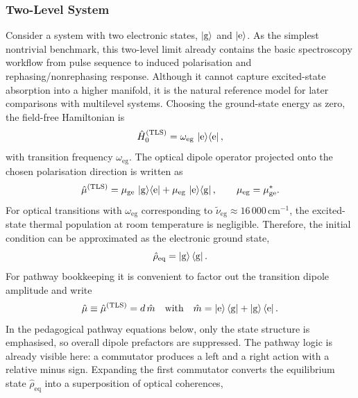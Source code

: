 \subsubsection{Two-Level System}
\label{sec:spctr_two_level_system_linear_response}
Consider a system with two electronic states, $\ket{\mathrm{g}}$ and $\ket{\mathrm{e}}$.
As the simplest nontrivial benchmark, this two-level limit already contains the basic spectroscopy workflow from pulse sequence to induced polarisation and rephasing/nonrephasing response.
Although it cannot capture excited-state absorption into a higher manifold, it is the natural reference model for later comparisons with multilevel systems.
Choosing the ground-state energy as zero, the field-free Hamiltonian is
\begin{equation}
	\hat{H}_{0}^{(\mathrm{TLS})} = \omega_{\mathrm{eg}}\,\ket{\mathrm{e}}\!\bra{\mathrm{e}},
	\label{eq:spctr_tls_hamiltonian}
\end{equation}
with transition frequency $\omega_{\mathrm{eg}}$.
The optical dipole operator projected onto the chosen polarisation direction is written as
\begin{equation}
	\hat{\mu}^{(\mathrm{TLS})}
	= \mu_{\mathrm{ge}}\,\ket{\mathrm{g}}\!\bra{\mathrm{e}} + \mu_{\mathrm{eg}}\,\ket{\mathrm{e}}\!\bra{\mathrm{g}},
	\qquad \mu_{\mathrm{eg}}=\mu_{\mathrm{ge}}^*.
	\label{eq:spctr_tls_dipole}
\end{equation}
For optical transitions with $\omega_{\mathrm{eg}}$ corresponding to $\tilde{\nu}_{\mathrm{eg}} \approx 16\,000\,\mathrm{cm}^{-1}$, the excited-state thermal population at room temperature is negligible.
Therefore, the initial condition can be approximated as the electronic ground state,
\begin{equation*}
	\hat{\rho}_{\mathrm{eq}} = \ket{\mathrm{g}}\bra{\mathrm{g}}.
\end{equation*}
For pathway bookkeeping it is convenient to factor out the transition dipole amplitude and write
\begin{equation*}
	\hat{\mu} \equiv \hat{\mu}^{(\mathrm{TLS})}=d\,\hat{m} \quad\text{with}\quad
	\hat{m} = \ket{\mathrm{e}}\bra{\mathrm{g}} + \ket{\mathrm{g}}\bra{\mathrm{e}}.
\end{equation*}
In the pedagogical pathway equations below, only the state structure is emphasised, so overall dipole prefactors are suppressed.
The pathway logic is already visible here: a commutator produces a left and a right action with a relative minus sign.
Expanding the first commutator converts the equilibrium state $\hat{\rho}_{\mathrm{eq}}$ into a superposition of optical coherences,
